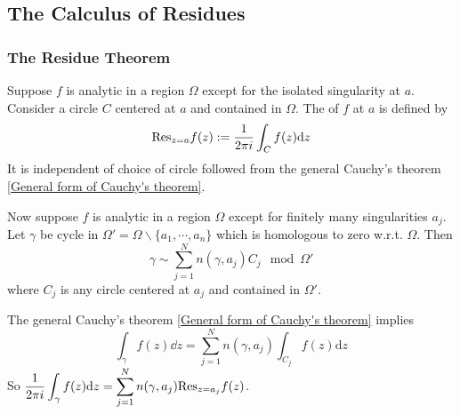 \subsection{The Calculus of Residues}
\subsubsection{The Residue Theorem}
Suppose  $ f  $ is analytic in a region  $ \Omega  $ except for the isolated singularity at  $ a  $. Consider a circle  $ C  $ centered at  $ a  $ and contained in  $ \Omega  $. The  of  $ f $ at  $ a  $ is defined by 
\begin{equation}
    \mathrm{Res}_{z=a}f(z):=\displaystyle\frac{1 }{2\pi i}\int_Cf(z)\mathrm{d}z
\end{equation} 
It is independent of choice of circle followed from the general Cauchy's theorem \ref{General form of Cauchy's theorem}.

Now suppose  $ f  $ is analytic in a region  $ \Omega  $ except for finitely many singularities  $ a_j $. Let  $ \gamma  $ be cycle in  $ \Omega'=\Omega\backslash\{a_1,\cdots,a_n\} $ which is homologous to zero w.r.t.  $ \Omega $. Then  
\begin{equation}
    \gamma\sim\sum_{j=1}^Nn(\gamma,a_j)C_j\mod \Omega'
\end{equation}  
where  $ C_j $ is any circle centered at  $ a_j $ and contained in  $ \Omega' $.

The general Cauchy's theorem  \ref{General form of Cauchy's theorem} implies 
\begin{equation}
    \int_\gamma f(z)\dd z=\sum_{j=1}^N n(\gamma,a_j)\int_{C_j}f(z)\mathrm{d}z
\end{equation}
So  $ \displaystyle\frac{1}{2\pi i}\int_\gamma f(z)\mathrm{d} z=\sum_{j=1}^Nn(\gamma,a_j)\mathrm{Res}_{z=a_j}f(z) $.

